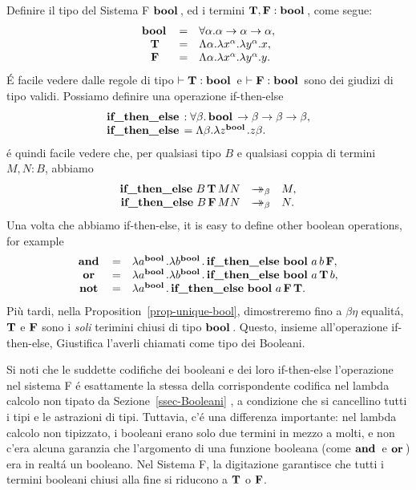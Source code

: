 \documentclass{article}
\begin{document}
Definire il tipo del Sistema F $\mathop{\textbf{\bf bool}\,}$, ed i termini ${\bf T},{\bf F}:\mathop{\textbf{\bf bool}\,}$, come segue:
\[ \begin{array}{ccl}
  \mathop{\textbf{\bf bool}\,} &=& \forall\alpha.\alpha\to\alpha\to\alpha,\\
  {\bf T} &=& \Lambda\alpha.\lambda x^{\alpha}.\lambda y^{\alpha}.x,\\
  {\bf F} &=& \Lambda\alpha.\lambda x^{\alpha}.\lambda y^{\alpha}.y.\\
\end{array}
\]
\'E facile vedere dalle regole di tipo $\vdash{\bf T}:\mathop{\textbf{\bf bool}\,}$ e
$\vdash{\bf F}:\mathop{\textbf{\bf bool}\,}$ sono dei giudizi di tipo validi. Possiamo definire una operazione
if-then-else 
\[ \begin{array}{l}
  \mathop{\textbf{\bf if\_then\_else}\,} : \forall\beta.\mathop{\textbf{\bf bool}\,}\to\beta\to\beta\to\beta,
  \\  \mathop{\textbf{\bf if\_then\_else}\,} = \Lambda\beta.\lambda z^{\mathop{\textbf{\bf bool}\,}}.z\beta.
\end{array}
\]
\'e quindi facile vedere che, per qualsiasi tipo $B$ e qualsiasi coppia di termini
$M,N:B$, abbiamo
\[ \begin{array}{rcl}
  \ifthenelset B\, \truet\, MN &\redbs& M,\\
  \ifthenelset B\, \falset\, MN &\redbs& N.
\end{array}
\]
Una volta che abbiamo if-then-else, it is easy to define other boolean
operations, for example
\[ \begin{array}{ccl}
  \mathop{\textbf{\bf and}\,} &=& \lambda a^{\mathop{\textbf{\bf bool}\,}}.\lambda b^{\mathop{\textbf{\bf bool}\,}}.\mathop{\textbf{\bf if\_then\_else}\,}\mathop{\textbf{\bf bool}\,} a\,b\,{\bf F},\\
  \mathop{\textbf{\bf or}\,} &=& \lambda a^{\mathop{\textbf{\bf bool}\,}}.\lambda b^{\mathop{\textbf{\bf bool}\,}}.\mathop{\textbf{\bf if\_then\_else}\,}\mathop{\textbf{\bf bool}\,} a\,{\bf T}\,b,\\
  \mathop{\textbf{\bf not}\,} &=& \lambda a^{\mathop{\textbf{\bf bool}\,}}.\mathop{\textbf{\bf if\_then\_else}\,}\mathop{\textbf{\bf bool}\,} a\,{\bf F}\,{\bf T}.
\end{array}
\]
Più tardi, nella Proposition~\ref{prop-unique-bool}, dimostreremo fino a
$\beta\eta$ equalit\'a, ${\bf T}$ e ${\bf F}$ sono i {\em soli}
terimini chiusi di tipo $\mathop{\textbf{\bf bool}\,}$. Questo, insieme all'operazione if-then-else,
Giustifica l'averli chiamati come tipo dei Booleani.

Si noti che le suddette codifiche dei booleani e dei loro if-then-else
 l'operazione nel sistema F \'e esattamente la stessa della corrispondente
 codifica nel  lambda calcolo non tipato da Sezione~\ref{ssec-Booleani}
, a condizione che si cancellino tutti i tipi e le  astrazioni di tipi. Tuttavia, c'\'e
 una differenza importante: nel lambda calcolo non tipizzato, i booleani erano solo
 due termini in mezzo a molti, e non c'era alcuna garanzia che l'argomento di una
 funzione booleana  (come $\mathop{\textbf{\bf and}\,}$ e $\mathop{\textbf{\bf or}\,}$) era in realt\'a un booleano. Nel Sistema F,
 la digitazione garantisce che tutti i termini booleani chiusi alla fine si riducono a ${\bf T}$ o ${\bf F}$.
\end{document}

